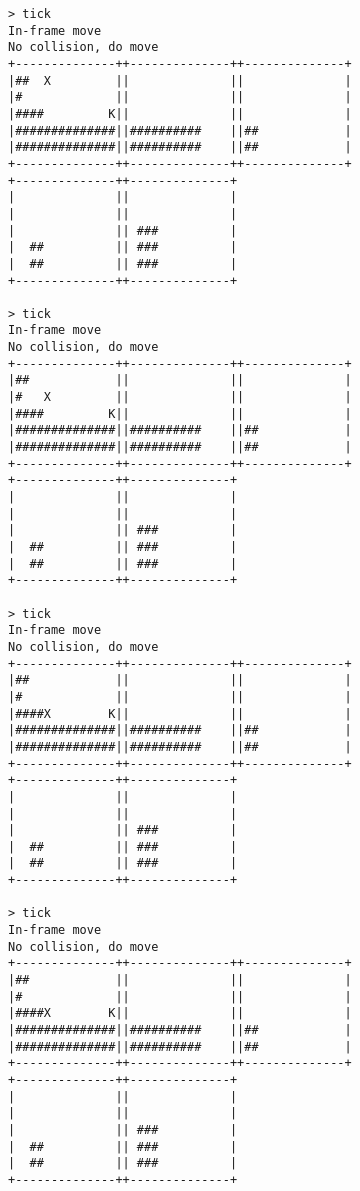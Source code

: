 \begin{verbatim}
> tick
In-frame move
No collision, do move
+--------------++--------------++--------------+
|##  X         ||              ||              |
|#             ||              ||              |
|####         K||              ||              |
|##############||##########    ||##            |
|##############||##########    ||##            |
+--------------++--------------++--------------+
+--------------++--------------+                
|              ||              |                
|              ||              |                
|              || ###          |                
|  ##          || ###          |                
|  ##          || ###          |                
+--------------++--------------+                

> tick
In-frame move
No collision, do move
+--------------++--------------++--------------+
|##            ||              ||              |
|#   X         ||              ||              |
|####         K||              ||              |
|##############||##########    ||##            |
|##############||##########    ||##            |
+--------------++--------------++--------------+
+--------------++--------------+                
|              ||              |                
|              ||              |                
|              || ###          |                
|  ##          || ###          |                
|  ##          || ###          |                
+--------------++--------------+                

> tick
In-frame move
No collision, do move
+--------------++--------------++--------------+
|##            ||              ||              |
|#             ||              ||              |
|####X        K||              ||              |
|##############||##########    ||##            |
|##############||##########    ||##            |
+--------------++--------------++--------------+
+--------------++--------------+                
|              ||              |                
|              ||              |                
|              || ###          |                
|  ##          || ###          |                
|  ##          || ###          |                
+--------------++--------------+                

> tick
In-frame move
No collision, do move
+--------------++--------------++--------------+
|##            ||              ||              |
|#             ||              ||              |
|####X        K||              ||              |
|##############||##########    ||##            |
|##############||##########    ||##            |
+--------------++--------------++--------------+
+--------------++--------------+                
|              ||              |                
|              ||              |                
|              || ###          |                
|  ##          || ###          |                
|  ##          || ###          |                
+--------------++--------------+                
\end{verbatim}
		        
